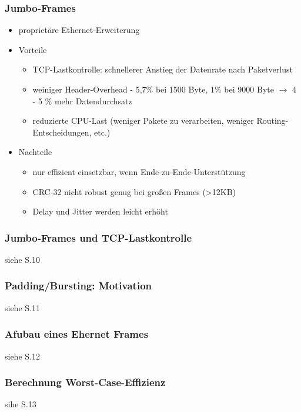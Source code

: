 \subsubsection{Jumbo-Frames}
\begin{itemize}
	\item proprietäre Ethernet-Erweiterung
	\item Vorteile
	\begin{itemize}
		\item TCP-Lastkontrolle: schnellerer Anstieg der Datenrate nach Paketverlust
		\item weiniger Header-Overhead - 5,7\% bei 1500 Byte, 1\% bei 9000 Byte $\to$ 4 - 5 \% mehr Datendurchsatz
		\item reduzierte CPU-Last (weniger Pakete zu verarbeiten, weniger Routing-Entscheidungen, etc.)
	\end{itemize}
	\item Nachteile
	\begin{itemize}
		\item nur effizient einsetzbar, wenn Ende-zu-Ende-Unterstützung
		\item CRC-32 nicht robust genug bei großen Frames (>12KB)
		\item Delay und Jitter werden leicht erhöht
	\end{itemize}
\end{itemize}
\subsubsection{Jumbo-Frames und TCP-Lastkontrolle}
siehe S.10
\subsubsection{Padding/Bursting: Motivation}
siehe S.11
\subsubsection{Afubau eines Ehernet Frames}
siehe S.12
\subsubsection{Berechnung Worst-Case-Effizienz}
sihe S.13

